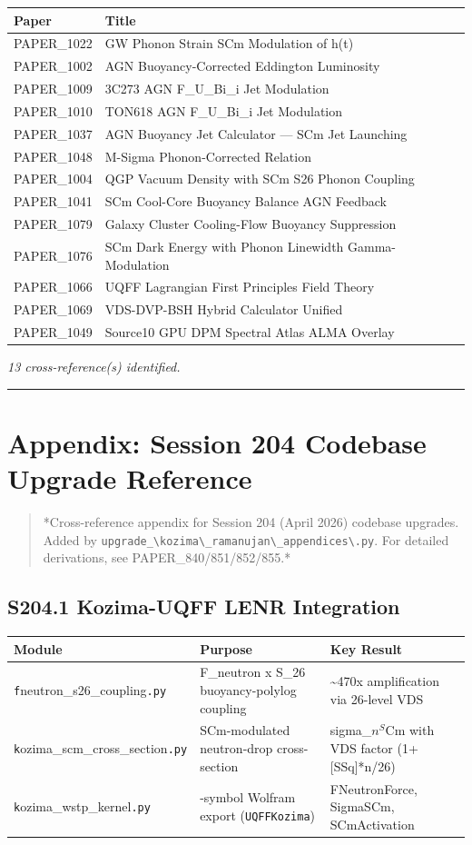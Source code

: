 \documentclass[12pt,a4paper]{article}
\begin{document}
\begin{table}[H]
\centering
\small
\begin{tabularx}{\linewidth}{@{}>{\raggedright\arraybackslash}X>{\raggedright\arraybackslash}X@{}}
\toprule
Paper & Title \tabularnewline
\midrule
PAPER\_1022 & GW Phonon Strain SCm Modulation of h(t) \tabularnewline
PAPER\_1002 & AGN Buoyancy-Corrected Eddington Luminosity \tabularnewline
PAPER\_1009 & 3C273 AGN F\_{U\_Bi\_i} Jet Modulation \tabularnewline
PAPER\_1010 & TON618 AGN F\_{U\_Bi\_i} Jet Modulation \tabularnewline
PAPER\_1037 & AGN Buoyancy Jet Calculator --- SCm Jet Launching \tabularnewline
PAPER\_1048 & M-Sigma Phonon-Corrected Relation \tabularnewline
PAPER\_1004 & QGP Vacuum Density with SCm S26 Phonon Coupling \tabularnewline
PAPER\_1041 & SCm Cool-Core Buoyancy Balance AGN Feedback \tabularnewline
PAPER\_1079 & Galaxy Cluster Cooling-Flow Buoyancy Suppression \tabularnewline
PAPER\_1076 & SCm Dark Energy with Phonon Linewidth Gamma-Modulation \tabularnewline
PAPER\_1066 & UQFF Lagrangian First Principles Field Theory \tabularnewline
PAPER\_1069 & VDS-DVP-BSH Hybrid Calculator Unified \tabularnewline
PAPER\_1049 & Source10 GPU DPM Spectral Atlas ALMA Overlay \tabularnewline
\bottomrule
\end{tabularx}
\end{table}

\emph{13 cross-reference(s) identified.}

\medskip\hrule\medskip

\section{Appendix: Session 204 Codebase Upgrade Reference}

\begin{quote}
*Cross-reference appendix for Session 204 (April 2026) codebase upgrades.
Added by \texttt{upgrade\_\textbackslash {kozima\textbackslash \_ramanujan\textbackslash \_appendices\textbackslash }.py}. For detailed derivations,
see PAPER\_840/851/852/855.*
\end{quote}

\subsection{S204.1 Kozima-UQFF LENR Integration}

\begin{table}[H]
\centering
\small
\begin{tabularx}{\linewidth}{@{}>{\raggedright\arraybackslash}X>{\raggedright\arraybackslash}X>{\raggedright\arraybackslash}X@{}}
\toprule
Module & Purpose & Key Result \tabularnewline
\midrule
\texttt{f}neutron\_{s26\_coupling}\texttt{.py} & F\_neutron x S\_26 buoyancy-polylog coupling & \textasciitilde{}470x amplification via 26-level VDS \tabularnewline
\texttt{k}ozima\_{scm\_cross\_section}\texttt{.py} & SCm-modulated neutron-drop cross-section & sigma\_$n^{S}$Cm with VDS factor (1+[SSq]*n/26) \tabularnewline
\texttt{k}ozima\_{wstp\_kernel}\texttt{.py} & 11-symbol Wolfram export (\texttt{UQFFKozima}) & FNeutronForce, SigmaSCm, SCmActivation \tabularnewline
\bottomrule
\end{tabularx}
\end{table}
\end{document}

